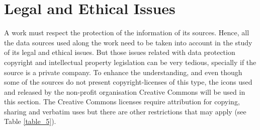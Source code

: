 \section{Legal and Ethical Issues}\label{sec:legalandethicalissues}


A work must respect the protection of the information of its sources. Hence, all the data sources used along the work need to be taken into account in the study of its legal and ethical issues. But those issues related with data protection copyright and intellectual property legislation can be very tedious, specially if the source is a private company. To enhance the understanding, and even though some of the sources do not present copyright-licenses of this type, the icons used and released by the non-profit organisation Creative Commons will be used in this section. The Creative Commons licenses  require attribution for copying, sharing and verbatim uses but there are other restrictions that may apply (see Table \ref{table_5}).

